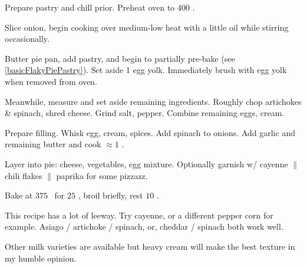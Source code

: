 \begin{preparation}
\item Prepare pastry and chill prior.
	Preheat oven to $400$ \Fahrenheit.

\item Slice onion, begin cooking over medium-low heat with a little oil while stirring occasionally.

\item Butter pie pan, add pastry, and begin to partially pre-bake (see \ref{basicFlakyPiePastry}).
	Set aside 1 egg yolk.
	Immediately brush with egg yolk when removed from oven.

\item Meanwhile, measure and set aside remaining ingredients.
	Roughly chop artichokes \& spinach, shred cheese.
	Grind salt, pepper.
	Combine remaining eggs, cream.

\item Prepare filling.
	Whisk egg, cream, spices.
	Add spinach to onions.
	Add garlic and remaining butter and cook $\approx 1$ \minute.

\item Layer into pie: cheese, vegetables, egg mixture.
	Optionally garnish w/ cayenne $\|$ chili flakes $\|$ paprika for some pizzazz.

\item Bake at $375$ \Fahrenheit~for $25$ \minute, broil briefly, rest $10$ \minute.
\end{preparation}


\begin{variation}
\item This recipe has a lot of leeway. Try cayenne, or a different pepper corn for example. Asiago / artichoke / spinach, or, cheddar / spinach both work well.

\item Other milk varieties are available but heavy cream will make the best texture in my humble opinion.
\end{variation}


\recipeend
